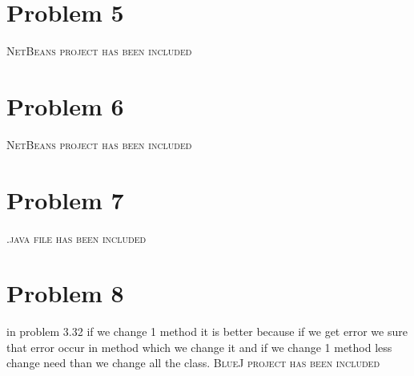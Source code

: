\documentclass[•]{article}
\begin{document}
\section{Problem 5}
\textsc{NetBeans project has been included} 
\section{Problem 6}
\textsc{NetBeans project has been included} 
\section{Problem 7}
\textsc{.java file has been included}
\section{Problem 8}
in problem 3.32 if we change 1 method it is better because if we get error we sure that error occur in method which we change it and if we change 1 method less change need than we change all the class.
\newline 
\textsc{BlueJ project has been included}
\end{document}
